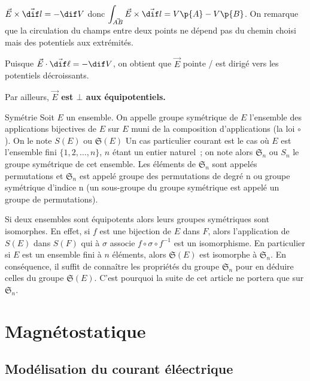     $\vec E\times\vec{\dif l} = -\dif V$ donc $\displaystyle \int_{\vec{AB}}\vec E\times\vec{\dif l} = V\p{A}-V\p{B}$. On remarque que la circulation du champs entre deux points ne dépend pas du chemin choisi mais des potentiels aux extrémités.
    \begin{property}{}{}
        Puisque $\vec E \cdot \vec {\dif \ell} = -\dif V$, on obtient que $\vec E$ pointe / est dirigé vers les potentiels décroissants.
        
        Par ailleurs, \bf{$\vec E$ est $\bot$ aux équipotentiels}.
    \end{property}

    \begin{definition}{Symétrie}{}
        Soit $E$ un ensemble. On appelle groupe symétrique de $E$ l'ensemble des applications bijectives de $E$ sur $E$ muni de la composition d'applications (la loi $\circ$). On le note $S(E)$ ou $ {\displaystyle {\mathfrak {S}}(E)}$
        Un cas particulier courant est le cas où $E$ est l'ensemble fini $\{1, 2, … , n\}$, $n$ étant un entier naturel ; on note alors $\mathfrak S_n$ ou $S_n$ le groupe symétrique de cet ensemble. Les éléments de $\mathfrak S_n$ sont appelés permutations et $\mathfrak S_n$ est appelé groupe des permutations de degré n ou groupe symétrique d'indice n (un sous-groupe du groupe symétrique est appelé un groupe de permutations).

Si deux ensembles sont équipotents alors leurs groupes symétriques sont isomorphes. En effet, si $f$ est une bijection de $E$ dans $F$, alors l'application de $S(E)$ dans $S(F)$ qui à $\sigma$ associe $f\circ\sigma\circ f^{−1}$ est un isomorphisme. En particulier si $E$ est un ensemble fini à $n$ éléments, alors ${\displaystyle {\mathfrak {S}}(E)}$ est isomorphe à $\mathfrak S_n$. En conséquence, il suffit de connaître les propriétés du groupe  $\mathfrak S_n$ pour en déduire celles du groupe ${\displaystyle {\mathfrak {S}}(E)}$. C'est pourquoi la suite de cet article ne portera que sur $\mathfrak S_n$. 
    \end{definition}
    
    \chapter{Magnétostatique}
    
    \chaptertoc
    
    \section{Modélisation du courant éléectrique}
    
